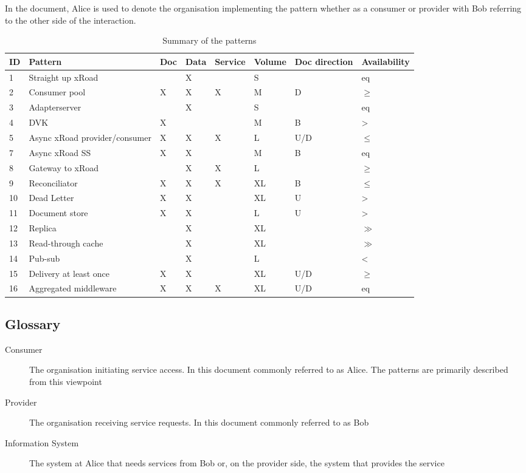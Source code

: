 \documentclass[10pt,a4paper]{article}
\begin{document}
In the document, Alice is used to denote the organisation implementing the pattern whether as a consumer or provider with Bob referring to the other side of the interaction.

\begin{table}
	\begin{center}
		\begin{tabular}{p{.6cm}p{3.4cm}p{.8cm}p{.8cm}p{.8cm}p{.8cm}p{1.2cm}p{1.2cm}}
		\toprule
ID & Pattern & Doc & Data & Service & Volume & Doc direction & Availability \\
\midrule
1 & Straight up xRoad &  & X &  & S &   & eq \\
2 & Consumer pool & X & X & X & M & D & $\geq$ \\
3 & Adapterserver &  & X &  & S &   & eq \\
4 & DVK & X &  &  & M & B & > \\
5 & Async xRoad provider/consumer & X & X & X & L & U/D & $\leq$ \\
7 & Async xRoad SS & X & X &  & M & B & eq \\
8 & Gateway to xRoad &  & X & X & L &   & $\geq$ \\
9 & Reconciliator & X & X & X & XL & B & $\leq$ \\
10 & Dead Letter & X & X &  & XL & U & > \\
11 & Document store & X & X &  & L & U & > \\
12 & Replica &  & X &  & XL &   & $\gg$ \\
13 & Read-through cache &  & X &  & XL &   & $\gg$ \\
14 & Pub-sub &  & X &  & L &  & < \\
15 & Delivery at least once & X & X & & XL & U/D & $\geq$ \\
16 & Aggregated middleware & X & X & X & XL & U/D & eq \\
\bottomrule
		\end{tabular}
		\caption{Summary of the patterns}
		\label{tab:dir}
	\end{center}
\end{table}

\subsection{Glossary}
\begin{description}
	\item[Consumer] The organisation initiating service access. In this document commonly referred to as Alice. The patterns are primarily described from this viewpoint
	\item[Provider] The organisation receiving service requests. In this document commonly referred to as Bob 
	\item[Information System] The system at Alice that needs services from Bob or, on the provider side, the system that provides the service
\end{description}
\end{document}
